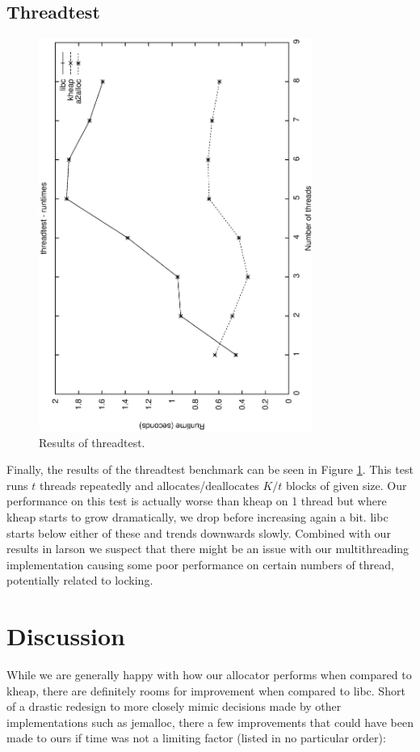 \documentclass[11pt,twoside]{article}
\begin{document}
\subsection{Threadtest}
\begin{figure}[!htbp]
    \centering
    \includegraphics[width=0.8\textwidth]{threadtest.ps}
    \caption{Results of threadtest.}
    \label{fig:threadtest}
\end{figure}

Finally, the results of the threadtest benchmark can be seen in Figure \ref{fig:threadtest}. This test runs $t$ threads repeatedly and allocates/deallocates $K/t$ blocks of given size. Our performance on this test is actually worse than kheap on 1 thread but where kheap starts to grow dramatically, we drop before increasing again a bit. libc starts below either of these and trends downwards slowly. Combined with our results in larson we suspect that there might be an issue with our multithreading implementation causing some poor performance on certain numbers of thread, potentially related to locking.


\section{Discussion}
While we are generally happy with how our allocator performs when compared to kheap, there are definitely rooms for improvement when compared to libc. Short of a drastic redesign to more closely mimic decisions made by other implementations such as jemalloc, there a few improvements that could have been made to ours if time was not a limiting factor (listed in no particular order):
\end{document}
